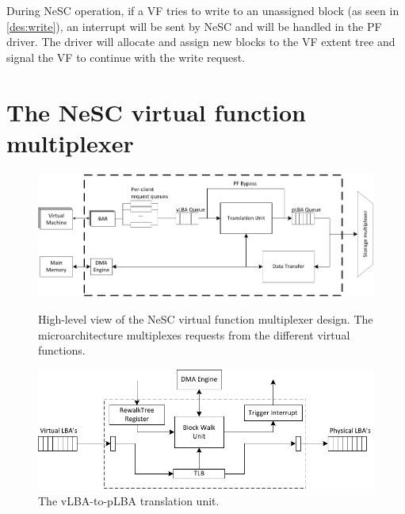 During NeSC operation, if a VF tries to write to an unassigned block (as seen in \ref{des:write}), an interrupt will be sent by NeSC and will be handled in the PF driver. The driver will allocate and assign new blocks to the
VF extent tree and signal the VF to continue with the write request.

\section{The NeSC virtual function multiplexer}

\begin{figure}[t]
  \centering
  \includegraphics[width=\textwidth]{figs/virtual_function.pdf}
  \caption{High-level view of the NeSC virtual function multiplexer design. The microarchitecture multiplexes requests from the different virtual functions.}
   \label{fig:virtualfunction}

   \vspace*{3ex}
   
  \centering
  \includegraphics[width=1.1\textwidth]{figs/translation_unit.pdf}
  \caption{The vLBA-to-pLBA translation unit.}
   \label{fig:translation_unit}
\end{figure}

